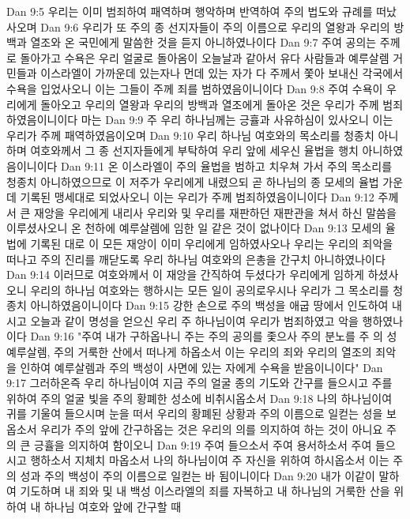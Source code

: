 Dan 9:5  우리는 이미 범죄하여 패역하며 행악하며 반역하여 주의 법도와 규례를 떠났사오며
Dan 9:6  우리가 또 주의 종 선지자들이 주의 이름으로 우리의 열왕과 우리의 방백과 열조와 온 국민에게 말씀한 것을 듣지 아니하였나이다
Dan 9:7  주여 공의는 주께로 돌아가고 수욕은 우리 얼굴로 돌아옴이 오늘날과 같아서 유다 사람들과 예루살렘 거민들과 이스라엘이 가까운데 있는자나 먼데 있는 자가 다 주께서 쫓아 보내신 각국에서 수욕을 입었사오니 이는 그들이 주께 죄를 범하였음이니이다
Dan 9:8  주여 수욕이 우리에게 돌아오고 우리의 열왕과 우리의 방백과 열조에게 돌아온 것은 우리가 주께 범죄하였음이니이다 마는
Dan 9:9  주 우리 하나님께는 긍휼과 사유하심이 있사오니 이는 우리가 주께 패역하였음이오며
Dan 9:10  우리 하나님 여호와의 목소리를 청종치 아니하며 여호와께서 그 종 선지자들에게 부탁하여 우리 앞에 세우신 율법을 행치 아니하였음이니이다
Dan 9:11  온 이스라엘이 주의 율법을 범하고 치우쳐 가서 주의 목소리를 청종치 아니하였으므로 이 저주가 우리에게 내렸으되 곧 하나님의 종 모세의 율법 가운데 기록된 맹세대로 되었사오니 이는 우리가 주께 범죄하였음이니이다
Dan 9:12  주께서 큰 재앙을 우리에게 내리사 우리와 및 우리를 재판하던 재판관을 쳐서 하신 말씀을 이루셨사오니 온 천하에 예루살렘에 임한 일 같은 것이 없나이다
Dan 9:13  모세의 율법에 기록된 대로 이 모든 재앙이 이미 우리에게 임하였사오나 우리는 우리의 죄악을 떠나고 주의 진리를 깨닫도록 우리 하나님 여호와의 은총을 간구치 아니하였나이다
Dan 9:14  이러므로 여호와께서 이 재앙을 간직하여 두셨다가 우리에게 임하게 하셨사오니 우리의 하나님 여호와는 행하시는 모든 일이 공의로우시나 우리가 그 목소리를 청종치 아니하였음이니이다
Dan 9:15  강한 손으로 주의 백성을 애굽 땅에서 인도하여 내시고 오늘과 같이 명성을 얻으신 우리 주 하나님이여 우리가 범죄하였고 악을 행하였나이다
Dan 9:16  "주여 내가 구하옵나니 주는 주의 공의를 좇으사 주의 분노를 주 의 성 예루살렘, 주의 거룩한 산에서 떠나게 하옵소서 이는 우리의 죄와 우리의 열조의 죄악을 인하여 예루살렘과 주의 백성이 사면에 있는 자에게 수욕을 받음이니이다"
Dan 9:17  그러하온즉 우리 하나님이여 지금 주의 얼굴 종의 기도와 간구를 들으시고 주를 위하여 주의 얼굴 빛을 주의 황폐한 성소에 비취시옵소서
Dan 9:18  나의 하나님이여 귀를 기울여 들으시며 눈을 떠서 우리의 황폐된 상황과 주의 이름으로 일컫는 성을 보옵소서 우리가 주의 앞에 간구하옵는 것은 우리의 의를 의지하여 하는 것이 아니요 주의 큰 긍휼을 의지하여 함이오니
Dan 9:19  주여 들으소서 주여 용서하소서 주여 들으시고 행하소서 지체치 마옵소서 나의 하나님이여 주 자신을 위하여 하시옵소서 이는 주의 성과 주의 백성이 주의 이름으로 일컫는 바 됨이니이다
Dan 9:20  내가 이같이 말하여 기도하며 내 죄와 및 내 백성 이스라엘의 죄를 자복하고 내 하나님의 거룩한 산을 위하여 내 하나님 여호와 앞에 간구할 때
